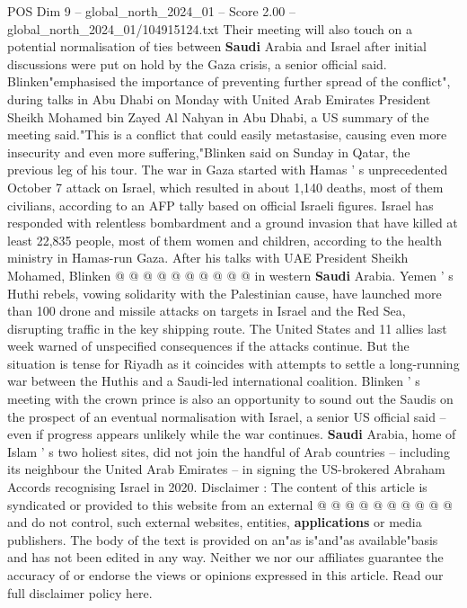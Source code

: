 \begin{textsample}{POS Dim 9 – global\_north\_2024\_01 – Score 2.00 – global\_north\_2024\_01/104915124.txt}  \label{ex:f9_pos_251}
Their meeting will also touch on a potential normalisation of ties between \textbf{Saudi} Arabia and Israel after initial discussions were put on hold by the Gaza crisis, a senior official said.
Blinken"emphasised the importance of preventing further spread of the conflict", during talks in Abu Dhabi on Monday with United Arab Emirates President Sheikh Mohamed bin Zayed Al Nahyan in Abu Dhabi, a US summary of the meeting said."This is a conflict that could easily metastasise, causing even more insecurity and even more suffering,"Blinken said on Sunday in Qatar, the previous leg of his tour.
The war in Gaza started with Hamas ' s unprecedented October 7 attack on Israel, which resulted in about 1,140 deaths, most of them civilians, according to an AFP tally based on official Israeli figures.
Israel has responded with relentless bombardment and a ground invasion that have killed at least 22,835 people, most of them women and children, according to the health ministry in Hamas-run Gaza.
After his talks with UAE President Sheikh Mohamed, Blinken @ @ @ @ @ @ @ @ @ @ in western \textbf{Saudi} Arabia.
Yemen ' s Huthi rebels, vowing solidarity with the Palestinian cause, have launched more than 100 drone and missile attacks on targets in Israel and the Red Sea, disrupting traffic in the key shipping route.
The United States and 11 allies last week warned of unspecified consequences if the attacks continue.
But the situation is tense for Riyadh as it coincides with attempts to settle a long-running war between the Huthis and a Saudi-led international coalition.
Blinken ' s meeting with the crown prince is also an opportunity to sound out the Saudis on the prospect of an eventual normalisation with Israel, a senior US official said -- even if progress appears unlikely while the war continues. \textbf{Saudi} Arabia, home of Islam ' s two holiest sites, did not join the handful of Arab countries -- including its neighbour the United Arab Emirates -- in signing the US-brokered Abraham Accords recognising Israel in 2020.
Disclaimer : The content of this article is syndicated or provided to this website from an external @ @ @ @ @ @ @ @ @ @ and do not control, such external websites, entities, \textbf{applications} or media publishers.
The body of the text is provided on an"as is"and"as available"basis and has not been edited in any way.
Neither we nor our affiliates guarantee the accuracy of or endorse the views or opinions expressed in this article.
Read our full disclaimer policy here.

\end{textsample}
